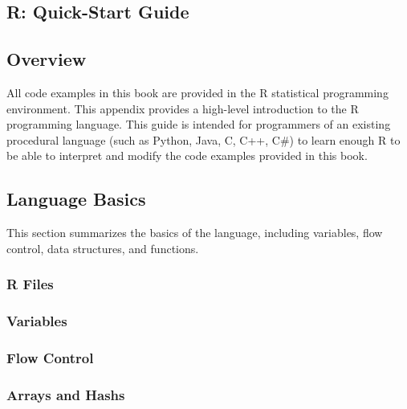 

\renewcommand{\chaptermark}[1]{\markboth{\thechapter.\ #1}{}}
\begin{bibunit}
\chapter{R: Quick-Start Guide}
\label{ch:appendix1}

\section{Overview}
All code examples in this book are provided in the R statistical programming environment.
This appendix provides a high-level introduction to the R programming language. This guide is intended for programmers of an existing procedural language (such as Python, Java, C, C++, C\#) to learn enough R to be able to interpret and modify the code examples provided in this book.

\section{Language Basics}
This section summarizes the basics of the language, including variables, flow control, data structures, and functions.

\subsection{R Files}

\subsection{Variables}


\subsection{Flow Control}

\subsection{Arrays and Hashs}


\end{bibunit}
